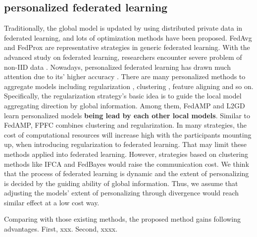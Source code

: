 \documentclass[journal]{IEEEtran}
\begin{document}
\subsection{personalized federated learning}
Traditionally, the global model is updated by using distributed private data in federated learning, and lots of optimization methods have been proposed.  FedAvg\cite{McMahan2016CommunicationEfficientLO} and FedProx\cite{Sahu2018FederatedOI} are representative strategies in generic federated learning. With the advanced study on federated learning, researchers encounter severe problem of non-IID data \cite{xxx}. Nowadays,  personalized federated learning has drawn much attention due to its' higher accuracy \cite{Zhu2021FederatedLO}. There are many personalized methods to aggregate models including regularization \cite{xx}, clustering \cite{xx}, feature aligning \cite{xx} and so on. Specifically, the regularization strategy's basic idea is to guide the local model aggregating direction by global information. Among them, FedAMP\cite{Huang2020PersonalizedCF} and L2GD\cite{Hanzely2020FederatedLO} learn personalized models {\textbf{being lead by each other local models}}. Similar to FedAMP, FPFC\cite{Yu2022ClusteredFL} combines clustering and regularization. In many strategies, the cost of computational resources will increase high with the participants mounting up, when introducing regularization to federated learning. That may limit these methods applied into federated learning. However, strategies based on clustering methods like IFCA \cite{Ghosh2020AnEF} and FedBayes \cite{Zhang2022PersonalizedFL} would raise the communication cost. We think that the process of federated learning is dynamic and the extent of personalizing is decided by the guiding ability of global information. Thus, we assume that adjusting the models' extent of personalizing through divergence would reach similar effect at a low cost way.

Comparing with those existing methods, the proposed method gains following advantages. First, xxx. Second, xxxx.
\end{document}
